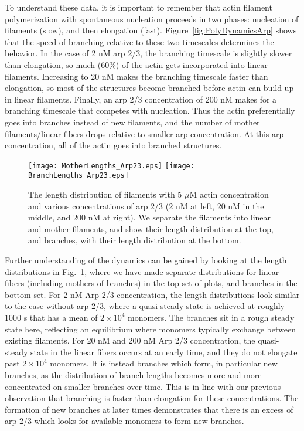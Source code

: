 \documentclass[11pt]{article}
\begin{document}
To understand these data, it is important to remember that actin filament polymerization with spontaneous nucleation proceeds in two phases: nucleation of filaments (slow), and then elongation (fast). Figure\ \ref{fig:PolyDynamicsArp} shows that the speed of branching relative to these two timescales determines the behavior. In the case of 2 nM arp 2/3, the branching timescale is slightly slower than elongation, so much (60\%) of the actin gets incorporated into linear filaments. Increasing to 20 nM makes the branching timescale faster than elongation, so most of the structures become branched before actin can build up in linear filaments. Finally, an arp 2/3 concentration of 200 nM makes for a branching timescale that competes with nucleation. Thus the actin preferentially goes into branches instead of new filaments, and the number of mother filaments/linear fibers drops relative to smaller arp concentration. At this arp concentration, all of the actin goes into branched structures. 


\begin{figure}
\centering
\texttt{[image: MotherLengths\_Arp23.eps]}
\texttt{[image: BranchLengths\_Arp23.eps]}
\caption{\label{fig:LengthDistsArp} The length distribution of filaments with 5 $\mu$M actin concentration and various concentrations of arp 2/3 (2 nM at left, 20 nM in the middle, and 200 nM at right). We separate the filaments into linear and mother filaments, and show their length distribution at the top, and branches, with their length distribution at the bottom. }
\end{figure}

Further understanding of the dynamics can be gained by looking at the length distributions in Fig.\ \ref{fig:LengthDistsArp}, where we have made separate distributions for linear fibers (including mothers of branches) in the top set of plots, and branches in the bottom set. For 2 nM Arp 2/3 concentration, the length distributions look similar to the case without arp 2/3, where a quasi-steady state is achieved at roughly 1000 s that has a mean of $2 \times 10^4$ monomers. The branches sit in a rough steady state here, reflecting an equilibrium where monomers typically exchange between existing filaments. For 20 nM and 200 nM Arp 2/3 concentration, the quasi-steady state in the linear fibers occurs at an early time, and they do not elongate past $2 \times 10^4$ monomers. It is instead branches which form, in particular new branches, as the distribution of branch lengths becomes more and more concentrated on smaller branches over time. This is in line with our previous observation that branching is faster than elongation for these concentrations. The formation of new branches at later times demonstrates that there is an excess of arp 2/3 which looks for available monomers to form new branches. 
\end{document}
